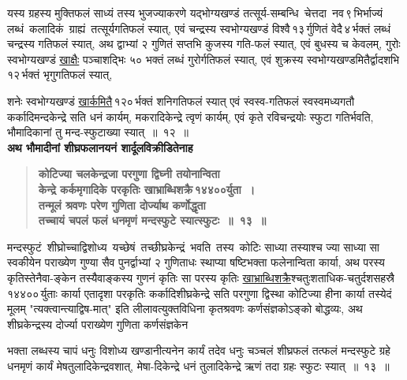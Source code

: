 \documentclass[11pt, openany]{book}
\begin{document}
यस्य ग्रहस्य मुक्तिफलं साध्यं तस्य भुजज्याकरणे यद्भोग्यखण्डं तत्सूर्य-सम्बन्धि \,चेत्तदा \,नव\textendash \,९\textendash \,भिर्भाज्यं \,लब्धं \,कलादिकं \,ग्राह्यं \,तत्सूर्यगतिफलं स्यात्, \;एवं \;चन्द्रस्य \;स्वभोग्यखण्डं \;विश्वै\textendash \,१३\textendash \,र्गुणितं \;वेदै\textendash \,४\textendash \,र्भक्तं \;लब्धं चन्द्रस्य गतिफलं स्यात्, अथ द्वाभ्यां २ गुणितं सप्तभि कुजस्य गति-फलं स्यात्, एवं बुधस्य च केवलम्, गुरोः स्वभोग्यखण्डं \hyperref[2.12]{खाक्षैः} पञ्चाशद्भिः ५० भक्तं लब्धं गुरोर्गतिफलं स्यात्, एवं शुक्रस्य स्वभोग्यखण्डमितैर्द्वादशभि\textendash \,१२\textendash \,र्भक्तं भृगुगतिफलं स्यात्,

\newpage

\noindent शनेः स्वभोग्यखण्डं \hyperref[2.12]{खार्कमितै}\textendash \,१२०\textendash \,र्भक्तं शनिगतिफलं स्यात् एवं स्वस्व-गतिफलं स्वस्वमध्यगतौ कर्कादिमन्दकेन्द्रे सति धनं कार्यम्, मकरादिकेन्द्रे त्वृणं कार्यम्, एवं कृते रविचन्द्रयोः स्फुटा गतिर्भवति, भौमादिकानां तु मन्द-स्फुटाख्या स्यात्~॥~१२~॥\\

{\small \textbf{अथ भौमादीनां शीघ्रफलानयनं शार्दूलविक्रीडितेनाह\textendash }}

 \label{2.13}
\begin{quote}
{\large \textbf{{\color{purple}कोटिज्या चलकेन्द्रजा परगुणा द्विघ्नी तयोनान्विता\\
केन्द्रे कर्कमृगादिके परकृतिः खाभ्राब्धिशक्रै\textendash \,१४४००\textendash र्युता~।\\
तन्मूलं श्रवणः परेण गुणिता दोर्ज्याथ कर्णोद्धृता \\
तच्चायं चपलं फलं धनमृणं मन्दस्फुटे स्यात्स्फुटः~॥~१३~॥}}}
\end{quote}

मन्दस्फुटं \,शीघ्रोच्चाद्विशोध्य \,यच्छेषं \,तच्छीघ्रकेन्द्रं \,भवति \,तस्य \,कोटिः साध्या तस्याश्च ज्या साध्या सा स्वकीयेन पराख्येण गुण्या सैव पुनर्द्वाभ्यां २ गुणिताधः स्थाप्या षष्टिभक्ता फलेनान्विता कार्या, अथ परस्य कृतिस्तेनैवा-ङ्केन तस्यैवाङ्कस्य गुणनं कृतिः सा परस्य कृतिः \hyperref[2.13]{खाभ्राब्धिशक्रै}श्चतुःशताधिक-चतुर्दशसहस्रै\textendash \,१४४००\textendash \,र्युताः कार्या एतादृशा परकृतिः कर्कादिशीघ्रकेन्द्रे सति परगुणा द्विस्था कोटिज्या हीना कार्या तस्येदं मूलम् {\color{violet}"त्यक्त्वान्त्याद्विष-मात्"} इति {\color{violet}लीलावत्यु}क्तविधिना कृतश्रवणः कर्णसंज्ञकोऽङ्को बोद्धव्यः, अथ शीघ्रकेन्द्रस्य दोर्ज्या पराख्येण गुणिता कर्णसंज्ञकेन

\newpage

\noindent भक्ता लब्धस्य चापं धनुः विशोध्य खण्डानीत्यनेन कार्यं तदेव धनुः चञ्चलं शीघ्रफलं तत्फलं मन्दस्फुटे ग्रहे धनमृणं कार्यं मेषतुलादिकेन्द्रवशात्, मेषा-दिकेन्द्रे धनं तुलादिकेन्द्रे ऋणं तदा ग्रहः स्फुटः स्यात्~॥~१३~॥\\
\end{document}
